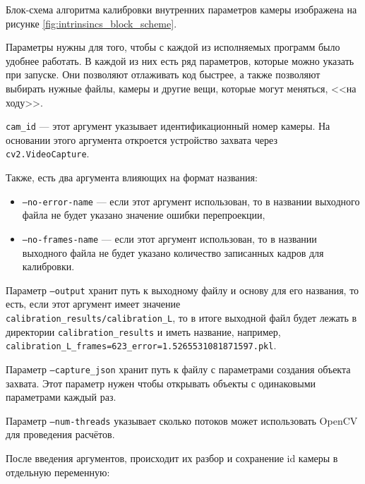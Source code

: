 \documentclass[14pt, a4paper]{extarticle}
\begin{document}
Блок-схема алгоритма калибровки внутренних параметров камеры изображена на
рисунке \ref{fig:intrinsincs_block_scheme}.

Параметры нужны для того, чтобы с каждой из исполняемых программ было удобнее работать.
В каждой из них есть ряд параметров, которые можно указать при запуске. 
Они позволяют отлаживать код быстрее, а также позволяют выбирать нужные файлы,
камеры и другие вещи, которые могут меняться, <<на ходу>>.
\par
\texttt{cam\_id} --- этот аргумент указывает идентификационный номер камеры.
На основании этого аргумента откроется устройство захвата через\\
\texttt{cv2.VideoCapture}. 

Также, есть два аргумента влияющих на формат названия:
\begin{itemize}
  \item \texttt{--no-error-name} --- если этот аргумент использован, то в
    названии выходного файла не будет указано значение ошибки перепроекции,
  \item \texttt{--no-frames-name} --- если этот аргумент использован, то в
    названии выходного файла не будет указано количество записанных кадров для
    калибровки.
\end{itemize}

Параметр \texttt{--output} хранит путь к выходному файлу и основу для его
названия, то есть, если этот аргумент имеет значение \\\texttt{calibration\_results/calibration\_L},
то в итоге выходной файл будет лежать в директории
\texttt{calibration\_results} и иметь название, например, \\
\texttt{calibration\_L\_frames=623\_error=1.5265531081871597.pkl}.

Параметр \texttt{--capture\_json} хранит путь к файлу с параметрами создания
объекта захвата. Этот параметр нужен чтобы открывать объекты с одинаковыми
параметрами каждый раз.

Параметр \texttt{--num-threads} указывает сколько потоков может использовать
OpenCV для проведения расчётов.

После введения аргументов, происходит их разбор и сохранение id камеры в
отдельную переменную:
\end{document}
